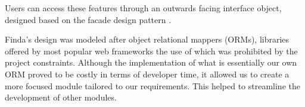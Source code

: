 \documentclass[main.tex]{subfiles}
\begin{document}
Users can access these features through an outwards facing interface object, designed based on the facade design pattern \cite{designPatterns}.

Finda's design was modeled after object relational mappers (ORMs), libraries offered by most popular web frameworks the use of which was prohibited by the project constraints. Although the implementation of what is essentially our own ORM proved to be costly in terms of developer time, it allowed us to create a more focused module tailored to our requirements. This helped to streamline the development of other modules.
\end{document}
